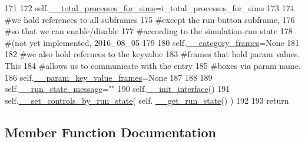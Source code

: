 \begin{DoxyCode}
171 
172         self.\hyperlink{classnegui_1_1pgguisimupop_1_1PGGuiSimuPop_a3885325060336297119229764f6548fb}{\_\_total\_processes\_for\_sims}=i\_total\_processes\_for\_sims
173 
174         \textcolor{comment}{#we hold references to all subframes}
175         \textcolor{comment}{#except the run-button subframe,}
176         \textcolor{comment}{#so that we can enable/disable}
177         \textcolor{comment}{#according to the simulation-run state}
178         \textcolor{comment}{#(not yet implemented, 2016\_08\_05}
179 
180         self.\hyperlink{classnegui_1_1pgguisimupop_1_1PGGuiSimuPop_a67da63f36462b56bd1f47206d8f91c7b}{\_\_category\_frames}=\textcolor{keywordtype}{None}
181 
182         \textcolor{comment}{#we also hold refernces to the keyvalue}
183         \textcolor{comment}{#frames that hold param values.  This}
184         \textcolor{comment}{#allows us to communicate with the entry}
185         \textcolor{comment}{#boxes via param name.}
186         self.\hyperlink{classnegui_1_1pgguisimupop_1_1PGGuiSimuPop_a272523ce4bad4d1073c506e858c59996}{\_\_param\_key\_value\_frames}=\textcolor{keywordtype}{None}
187 
188 
189         self.\hyperlink{classnegui_1_1pgguisimupop_1_1PGGuiSimuPop_a3ac3a7a5a800876180133b4cc41ca63c}{\_\_run\_state\_message}=\textcolor{stringliteral}{""}
190         self.\hyperlink{classnegui_1_1pgguisimupop_1_1PGGuiSimuPop_ad38b601eabe45f6c35525b060f0343ea}{\_\_init\_interface}()
191         self.\hyperlink{classnegui_1_1pgguisimupop_1_1PGGuiSimuPop_a2c5268e62f40c2548d1475959aa60ca9}{\_\_set\_controls\_by\_run\_state}( self.
      \hyperlink{classnegui_1_1pgguisimupop_1_1PGGuiSimuPop_aef182e14bccdbabf372a6344bc6f8786}{\_\_get\_run\_state}() )
192     
193         \textcolor{keywordflow}{return}
\end{DoxyCode}


\subsection{Member Function Documentation}
